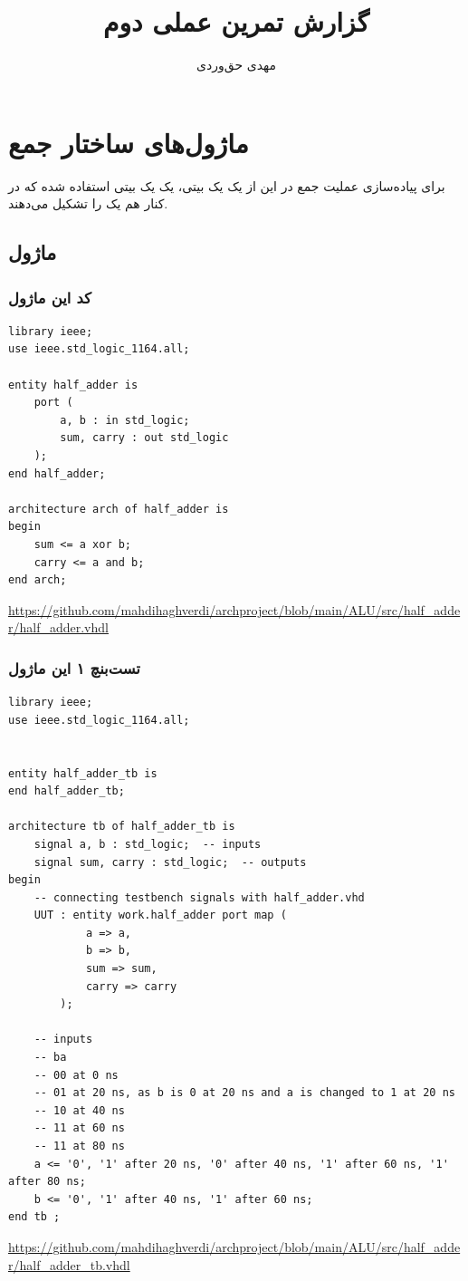 \documentclass[dvipsnames, svgnames, x11names, a4paper, 11pt, oneside]{book}
\title{گزارش تمرین عملی دوم}
\author{مهدی حق‌وردی}
\newcommand{\alu}{\lr{ALU}}
\begin{document}
	\maketitle
	\frontmatter
	\tableofcontents
	
	\mainmatter
		\chapter{ماژول‌‌های ساختار جمع}
			برای پیاده‌سازی عملیت جمع در این \alu از یک  یک بیتی، یک  یک بیتی استفاده شده که در کنار هم یک  را تشکیل می‌دهند.
			
				\section{ماژول }
					\subsection{کد این ماژول}		
						\begin{latin}
							\begin{lstlisting}
library ieee;
use ieee.std_logic_1164.all;

entity half_adder is
	port (
		a, b : in std_logic;
		sum, carry : out std_logic
	);
end half_adder;

architecture arch of half_adder is
begin
	sum <= a xor b;
	carry <= a and b;
end arch;
						\end{lstlisting}
						\url{https://github.com/mahdihaghverdi/archproject/blob/main/ALU/src/half_adder/half_adder.vhdl}
						\end{latin}	
					\subsection{تست‌بنچ ۱ این ماژول}
					
						\begin{latin}
							\begin{lstlisting}
library ieee;
use ieee.std_logic_1164.all;


entity half_adder_tb is
end half_adder_tb;

architecture tb of half_adder_tb is
	signal a, b : std_logic;  -- inputs
	signal sum, carry : std_logic;  -- outputs
begin
	-- connecting testbench signals with half_adder.vhd
	UUT : entity work.half_adder port map (
			a => a,
			b => b,
			sum => sum,
			carry => carry
		);
	
	-- inputs
	-- ba
	-- 00 at 0 ns
	-- 01 at 20 ns, as b is 0 at 20 ns and a is changed to 1 at 20 ns
	-- 10 at 40 ns
	-- 11 at 60 ns
	-- 11 at 80 ns
	a <= '0', '1' after 20 ns, '0' after 40 ns, '1' after 60 ns, '1' after 80 ns;
	b <= '0', '1' after 40 ns, '1' after 60 ns;
end tb ;
							\end{lstlisting}
							\url{https://github.com/mahdihaghverdi/archproject/blob/main/ALU/src/half_adder/half_adder_tb.vhdl}
						\end{latin}	
\end{document}
